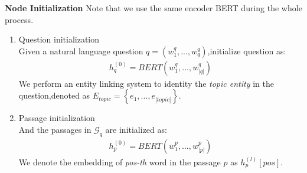 \documentclass[sigconf]{acmart}
\begin{document}
	\textbf{Node Initialization}
	Note that 	we use the same encoder BERT during the whole process.
	\begin{enumerate}[(1)]
		\item Question initialization\\
		Given a natural language question $q = (w_1^q,...,w_q^q)$,initialize question as:
		\begin{displaymath}
			\begin{aligned}
				h_q^{(0)} = BERT(w_1^q,...,w_{|q|}^q)				
			\end{aligned}
		\end{displaymath}
		We perform an entity linking system\cite{ferragina2011fast} to identity the \emph{topic entity} in the question,denoted as $E_{topic}=\left\{e_1,...,e_{|topic|}\right\}$.
		
		\item Passage initialization\\
		And the passages in $\mathcal{G}_q$ are initialized as:
		\begin{displaymath}
			\begin{aligned}
				h_{p}^{(0)} = BERT(w_1^{p},...,w_{|p|}^{p})				
			\end{aligned}
		\end{displaymath}	
		We denote  the embedding of  \emph{pos-th} word in the passage $p$ as $h^{(l)}_{p}[pos]$.
		
	\end{enumerate}
	
\end{document}
